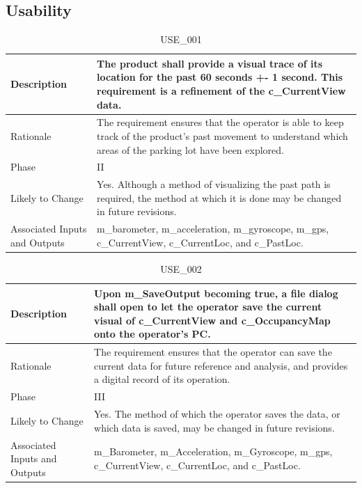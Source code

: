 \documentclass{article}
\begin{document}
\subsection{Usability}
\begin{table}[!h]
\begin{center}
\caption {USE\_001} 
\label{USE_001}
\begin{tabular}{ | m{3cm} | m{11cm} | }
\hline
Description & The product shall provide a visual trace of its location for the past 60 seconds +- 1 second. This requirement is a refinement of the c\_CurrentView data. \\
\hline
Rationale & The requirement ensures that the operator is able to keep track of the product's past movement to understand which areas of the parking lot have been explored. \\
\hline
Phase & II \\
\hline
Likely to Change & Yes. Although a method of visualizing the past path is required, the method at which it is done may be changed in future revisions.  \\
\hline
Associated Inputs and Outputs & m\_barometer, m\_acceleration, m\_gyroscope, m\_gps, c\_CurrentView, c\_CurrentLoc, and c\_PastLoc.  \\
\hline
\end{tabular}
\end{center}
\end{table}

\begin{table}[!h]
\begin{center}
\caption {USE\_002} 
\label{USE_002}
\begin{tabular}{ | m{3cm} | m{11cm} | }
\hline
Description & Upon m\_SaveOutput becoming true, a file dialog shall open to let the operator save the current visual of c\_CurrentView and c\_OccupancyMap onto the operator's PC.  \\
\hline
Rationale & The requirement ensures that the operator can save the current data for future reference and analysis, and provides a digital record of its operation. \\
\hline
Phase & III \\
\hline
Likely to Change & Yes. The method of which the operator saves the data, or which data is saved, may  be changed in future revisions. \\
\hline
Associated Inputs and Outputs & m\_Barometer, m\_Acceleration, m\_Gyroscope, m\_gps, c\_CurrentView, c\_CurrentLoc, and c\_PastLoc.  \\
\hline
\end{tabular}
\end{center}
\end{table}
\end{document}
